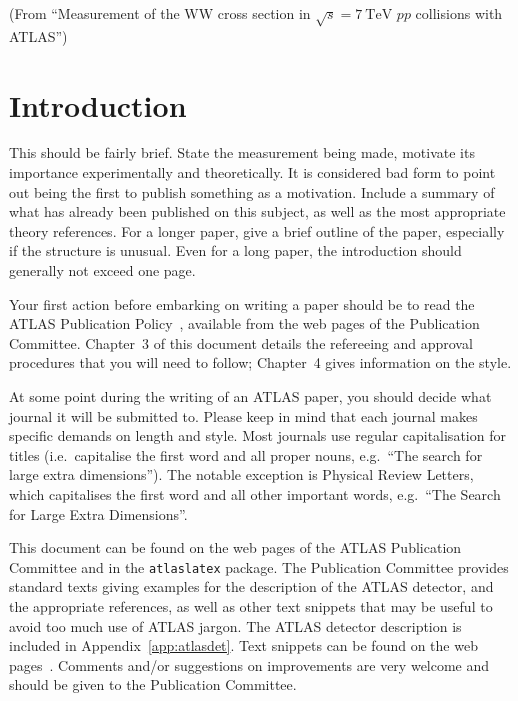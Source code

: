 \documentclass[PAPER,UKenglish,texlive=2016]{\ATLASLATEXPATH atlasdoc}
\begin{document}
\noindent(From \enquote{Measurement of the WW cross section in $\sqrt{s} = \SI{7}{\TeV}$ $pp$ collisions with ATLAS})


\section{Introduction}
\label{sec:intro}

This should be fairly brief. 
State the measurement being made, motivate its importance experimentally and theoretically.
It is considered bad form to point out being the first to publish something as a motivation.
Include a summary of what has already been published on this subject,
as well as the most appropriate theory references.
For a longer paper, give a brief outline of the paper, especially if the structure is unusual.
Even for a long paper, the introduction should generally not exceed one page.

Your first action before embarking on writing a paper should be to
read the ATLAS Publication Policy~\cite{publication-policy}, available
from the web pages of the Publication Committee. Chapter~3 of this
document details the refereeing and approval procedures that you will
need to follow; Chapter~4 gives information on the style.

At some point during the writing of an ATLAS paper, you should decide what journal it will be submitted to.
Please keep in mind that each journal makes specific demands on length and style.
Most journals use regular capitalisation for titles 
(i.e.\ capitalise the first word and all proper nouns, 
e.g.\ \enquote{The search for large extra dimensions}). 
The notable exception is Physical Review Letters, which capitalises the
first word and all other important words,
e.g.\ \enquote{The Search for Large Extra Dimensions}.

This document can be found on the web pages of the ATLAS Publication Committee
and in the \texttt{atlaslatex} package. 
The Publication Committee provides standard texts giving examples
for the description of the ATLAS detector, and the appropriate references,
as well as other text snippets that may be useful to avoid too much use of ATLAS jargon.
The ATLAS detector description is included in Appendix~\ref{app:atlasdet}.
Text snippets can be found on the web pages~\cite{pubcom-snippet}.
Comments and/or suggestions on improvements are very welcome and
should be given to the Publication Committee.
\end{document}

